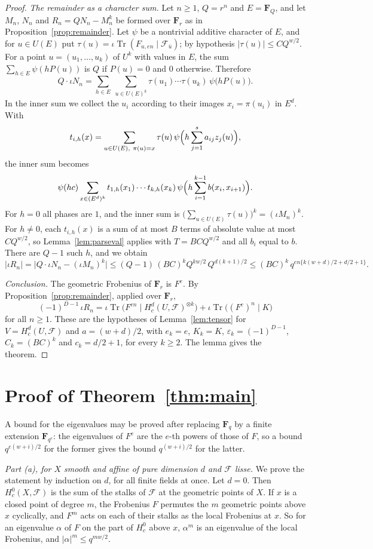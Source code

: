 \documentclass[11pt,a4paper]{article}
\theoremstyle{plain}
\theoremstyle{remark}
\newcommand{\Fq}{\mathbf F_q}
\newcommand{\F}{\mathcal F}
\newcommand{\Tr}{\operatorname{Tr}}
\begin{document}
\begin{proof}
\emph{The remainder as a character sum.} Let $n\ge1$, $Q=r^n$ and $E=\mathbf F_Q$, and let $M_n$, $N_n$ and
$R_n=QN_n-M_n^k$ be formed over $\mathbf F_r$ as in Proposition~\ref{prop:remainder}. Let $\psi$ be a nontrivial
additive character of $E$, and for $u\in U(E)$ put $\tau(u)=\iota\Tr(F_{u,en}\mid\F_{\bar u})$; by hypothesis
$|\tau(u)|\le CQ^{w/2}$. For a point $u=(u_1,\dots,u_k)$ of $U^k$ with values in $E$, the sum
$\sum_{h\in E}\psi(hP(u))$ is $Q$ if $P(u)=0$ and $0$ otherwise. Therefore
\[
Q\cdot\iota N_n=\sum_{h\in E}\ \sum_{u\in U(E)^k}\tau(u_1)\cdots\tau(u_k)\,\psi\bigl(hP(u)\bigr).
\]
In the inner sum we collect the $u_i$ according to their images $x_i=\pi(u_i)$ in $E^d$. With
\[
t_{i,h}(x)=\sum_{u\in U(E),\ \pi(u)=x}\tau(u)\,\psi\Bigl(h\sum_{j=1}^sa_{ij}z_j(u)\Bigr),
\]
the inner sum becomes
\[
\psi(hc)\sum_{x\in(E^d)^k}t_{1,h}(x_1)\cdots t_{k,h}(x_k)\,\psi\Bigl(h\sum_{i=1}^{k-1}b(x_i,x_{i+1})\Bigr).
\]
For $h=0$ all phases are $1$, and the inner sum is $\bigl(\sum_{u\in U(E)}\tau(u)\bigr)^k=(\iota M_n)^k$. For
$h\ne0$, each $t_{i,h}(x)$ is a sum of at most $B$ terms of absolute value at most $CQ^{w/2}$, so
Lemma~\ref{lem:parseval} applies with $T=BCQ^{w/2}$ and all $b_i$ equal to $b$. There are $Q-1$ such $h$, and we
obtain
\[
|\iota R_n|=\bigl|Q\cdot\iota N_n-(\iota M_n)^k\bigr|\le(Q-1)\,(BC)^kQ^{kw/2}\,Q^{d(k+1)/2}
\le(BC)^k\,q^{en\{k(w+d)/2+d/2+1\}}.
\]

\emph{Conclusion.} The geometric Frobenius of $\mathbf F_r$ is $F^e$. By Proposition~\ref{prop:remainder}, applied
over $\mathbf F_r$,
\[
(-1)^{D-1}\,\iota R_n=\iota\Tr\bigl(F^{en}\mid H^d_c(U,\F)^{\otimes k}\bigr)+\iota\Tr\bigl((F^e)^n\mid K\bigr)
\]
for all $n\ge1$. These are the hypotheses of Lemma~\ref{lem:tensor} for $V=H^d_c(U,\F)$ and $a=(w+d)/2$, with
$e_k=e$, $K_k=K$, $\varepsilon_k=(-1)^{D-1}$, $C_k=(BC)^k$ and $c_k=d/2+1$, for every $k\ge2$. The lemma gives the
theorem.
\end{proof}

\section{Proof of Theorem~\ref{thm:main}}\label{sec:proof}

A bound for the eigenvalues may be proved after replacing $\Fq$ by a finite extension $\mathbf F_{q^e}$: the
eigenvalues of $F^e$ are the $e$-th powers of those of $F$, so a bound $q^{e(w+i)/2}$ for the former gives the bound
$q^{(w+i)/2}$ for the latter.

\medskip\noindent\emph{Part (a), for $X$ smooth and affine of pure dimension $d$ and $\F$ lisse.} We prove the
statement by induction on $d$, for all finite fields at once. Let $d=0$. Then $H^0_c(X,\F)$ is the sum of the stalks
of $\F$ at the geometric points of $X$. If $x$ is a closed point of degree $m$, the Frobenius $F$ permutes the $m$
geometric points above $x$ cyclically, and $F^m$ acts on each of their stalks as the local Frobenius at $x$. So for
an eigenvalue $\alpha$ of $F$ on the part of $H^0_c$ above $x$, $\alpha^m$ is an eigenvalue of the local Frobenius,
and $|\alpha|^m\le q^{mw/2}$.
\end{document}

